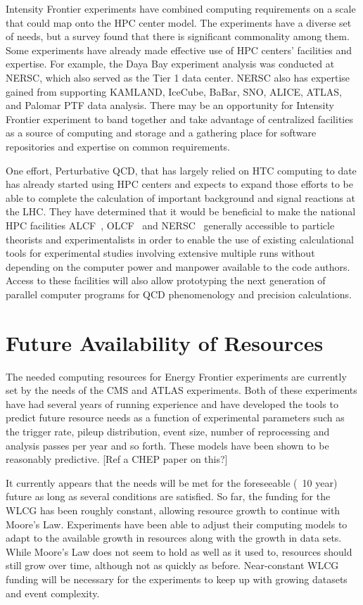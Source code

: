 Intensity Frontier experiments have combined computing requirements
on a scale that could map onto the HPC center model. The experiments 
have a diverse set of needs, but a survey found that
there is significant commonality among them. Some
experiments have already made effective use of HPC centers' facilities and
expertise. For example, the Daya Bay experiment analysis was conducted at NERSC, which also served as the Tier 1 data center. 
NERSC also has expertise gained from supporting KAMLAND, IceCube, BaBar, SNO, ALICE, ATLAS, and Palomar PTF data analysis. 
There may be an opportunity for Intensity Frontier experiment to band together and take advantage of centralized facilities
as a source of computing and storage and a gathering place for software repositories and expertise on common requirements.

One effort, Perturbative QCD,  that has largely relied on HTC computing to date has already started using HPC centers and expects to 
expand those efforts to be able to complete the calculation of important background and signal reactions at the
LHC.  
They have determined that it would be beneficial to make the national HPC
facilities ALCF~\cite{ALCF}, OLCF~\cite{OLCF} and NERSC~\cite{NERSC}
generally accessible to particle theorists and
experimentalists in order to enable the use of existing
calculational tools for experimental studies involving extensive
multiple runs without depending on the computer power and manpower
available to the code authors. Access to these facilities will also
allow prototyping the next generation of parallel computer programs
for QCD phenomenology and precision calculations.

 
\section{Future Availability of Resources}


The needed computing resources for Energy Frontier experiments are currently set by the needs of the CMS and ATLAS experiments.  Both of these experiments have had several years of running experience and have developed the tools to predict future resource needs as a function of experimental parameters such as the trigger rate, pileup distribution, event size, number of reprocessing and analysis passes per year and so forth.  These models have been shown to be reasonably predictive.  [Ref a CHEP paper on this?]

It currently appears that the needs will be met for the foreseeable (~10 year) future as long as several conditions are satisfied.  So far, the funding for the WLCG has been roughly constant, allowing resource growth to continue with Moore’s Law.  Experiments have been able to adjust their computing models to adapt to the available growth in resources along with the growth in data sets.  While Moore’s Law does not seem to hold as well as it used to, resources should still grow over time, although not as quickly as before.  Near-constant WLCG funding will be necessary for the experiments to keep up with growing datasets and event complexity.  

